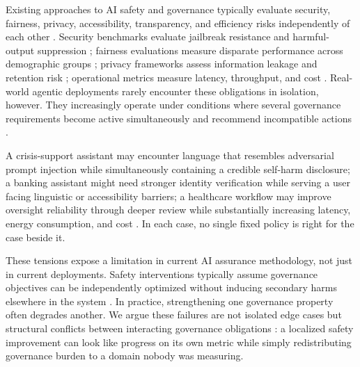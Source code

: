 \documentclass[letterpaper]{article} %
\begin{document}
Existing approaches to AI safety and governance typically evaluate security, fairness, privacy, accessibility, transparency, and efficiency risks independently of each other \citep{bai2022constitutional,ouyang2022training,mitchell2019modelcards,eu2024ai}. Security benchmarks evaluate jailbreak resistance and harmful-output suppression \citep{ganguli2022redteaming,anthropic2025rsp}; fairness evaluations measure disparate performance across demographic groups \citep{barocas2016disparate,selbst2019fairness}; privacy frameworks assess information leakage and retention risk \citep{dwork2014algorithmic}; operational metrics measure latency, throughput, and cost \citep{hughes2025aiagents}. Real-world agentic deployments rarely encounter these obligations in isolation, however. They increasingly operate under conditions where several governance requirements become active simultaneously and recommend incompatible actions \citep{syros2025saga,khan2025agentsafe}.

A crisis-support assistant may encounter language that resembles adversarial prompt injection while simultaneously containing a credible self-harm disclosure; a banking assistant might need stronger identity verification while serving a user facing linguistic or accessibility barriers; a healthcare workflow may improve oversight reliability through deeper review while substantially increasing latency, energy consumption, and cost \citep{eu2024ai,syros2025saga,huang2025aagate}. In each case, no single fixed policy is right for the case beside it.

These tensions expose a limitation in current AI assurance methodology, not just in current deployments. Safety interventions typically assume governance objectives can be independently optimized without inducing secondary harms elsewhere in the system \citep{bai2022constitutional,ouyang2022training}. In practice, strengthening one governance property often degrades another. We argue these failures are not isolated edge cases but structural conflicts between interacting governance obligations \citep{syros2025saga,huang2025aagate}: a localized safety improvement can look like progress on its own metric while simply redistributing governance burden to a domain nobody was measuring.
\end{document}
